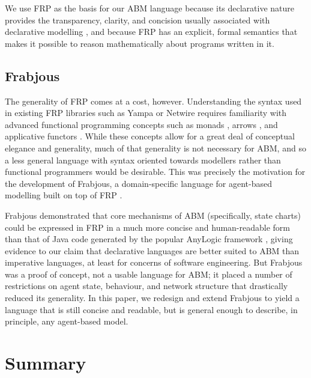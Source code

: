 \documentclass{sig-alternate}
\begin{document}
  We use FRP as the basis for our ABM language because its declarative nature provides the transparency, clarity, and concision usually associated with declarative modelling \cite{system_dyn_approaches, system_dyn_tradeoffs}, and because FRP has an explicit, formal semantics \cite{fran} that makes it possible to reason mathematically about programs written in it. 
  
  \subsection{Frabjous}
  
  The generality of FRP comes at a cost, however. Understanding the syntax used in existing FRP libraries such as Yampa \cite{yampa} or Netwire \cite {netwire} requires familiarity with advanced functional programming concepts such as monads \cite{monads}, arrows \cite{mon2arr}, and applicative functors \cite{applicative}. While these concepts allow for a great deal of conceptual elegance and generality, much of that generality is not necessary for ABM, and so a less general language with syntax oriented towards modellers rather than functional programmers would be desirable. This was precisely the motivation for the development of Frabjous, a domain-specific language for agent-based modelling built on top of FRP \cite{frabjous}.
  
  Frabjous demonstrated that core mechanisms of ABM (specifically, state charts) could be expressed in FRP in a much more concise and human-readable form than that of Java code generated by the popular AnyLogic framework \cite{frabjous}, giving evidence to our claim that declarative languages are better suited to ABM than imperative languages, at least for concerns of software engineering. But Frabjous was a proof of concept, not a usable language for ABM; it placed a number of restrictions on agent state, behaviour, and network structure that drastically reduced its generality. In this paper, we redesign and extend Frabjous to yield a language that is still concise and readable, but is general enough to describe, in principle, any agent-based model.
  
  
  
  
    
  
  






\section{Summary}
\end{document}
